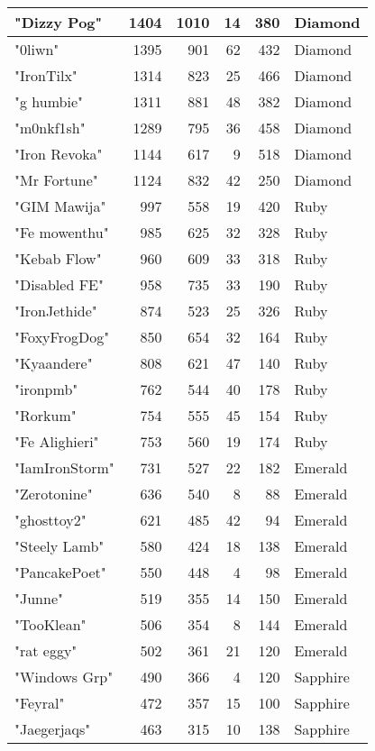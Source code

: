 \documentclass{article}
\begin{document}
\begin{table}[htbp]
\begin{tabular}{|l|r|r|r|r|l|}
"Dizzy Pog" & 1404 & 1010 & 14 & 380 & Diamond \\ \hline
"0liwn" & 1395 & 901 & 62 & 432 & Diamond \\ \hline
"IronTilx" & 1314 & 823 & 25 & 466 & Diamond \\ \hline
"g humbie" & 1311 & 881 & 48 & 382 & Diamond \\ \hline
"m0nkf1sh" & 1289 & 795 & 36 & 458 & Diamond \\ \hline
"Iron Revoka" & 1144 & 617 & 9 & 518 & Diamond \\ \hline
"Mr Fortune" & 1124 & 832 & 42 & 250 & Diamond \\ \hline
"GIM Mawija" & 997 & 558 & 19 & 420 & Ruby \\ \hline
"Fe mowenthu" & 985 & 625 & 32 & 328 & Ruby \\ \hline
"Kebab Flow" & 960 & 609 & 33 & 318 & Ruby \\ \hline
"Disabled FE" & 958 & 735 & 33 & 190 & Ruby \\ \hline
"IronJethide" & 874 & 523 & 25 & 326 & Ruby \\ \hline
"FoxyFrogDog" & 850 & 654 & 32 & 164 & Ruby \\ \hline
"Kyaandere" & 808 & 621 & 47 & 140 & Ruby \\ \hline
"ironpmb" & 762 & 544 & 40 & 178 & Ruby \\ \hline
"Rorkum" & 754 & 555 & 45 & 154 & Ruby \\ \hline
"Fe Alighieri" & 753 & 560 & 19 & 174 & Ruby \\ \hline
"IamIronStorm" & 731 & 527 & 22 & 182 & Emerald \\ \hline
"Zerotonine" & 636 & 540 & 8 & 88 & Emerald \\ \hline
"ghosttoy2" & 621 & 485 & 42 & 94 & Emerald \\ \hline
"Steely Lamb" & 580 & 424 & 18 & 138 & Emerald \\ \hline
"PancakePoet" & 550 & 448 & 4 & 98 & Emerald \\ \hline
"Junne" & 519 & 355 & 14 & 150 & Emerald \\ \hline
"TooKlean" & 506 & 354 & 8 & 144 & Emerald \\ \hline
"rat eggy" & 502 & 361 & 21 & 120 & Emerald \\ \hline
"Windows Grp" & 490 & 366 & 4 & 120 & Sapphire \\ \hline
"Feyral" & 472 & 357 & 15 & 100 & Sapphire \\ \hline
"Jaegerjaqs" & 463 & 315 & 10 & 138 & Sapphire \\ \hline

\end{tabular}
\end{table}
\end{document}
